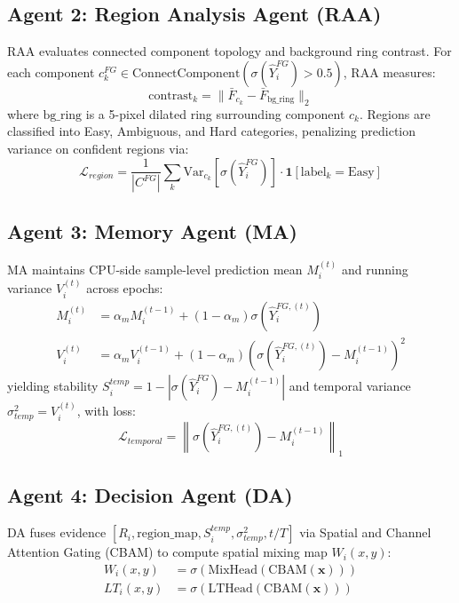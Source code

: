 \documentclass[journal,twoside,web]{IEEEtran}
\begin{document}
\subsection{Agent 2: Region Analysis Agent (RAA)}

RAA evaluates connected component topology and background ring contrast. For each component $c_k^{FG} \in \text{ConnectComponent}(\sigma(\hat{Y}_i^{FG}) > 0.5)$, RAA measures:
\begin{equation}
\text{contrast}_k = \|\bar{F}_{c_k} - \bar{F}_{\text{bg\_ring}}\|_2
\end{equation}
where $\text{bg\_ring}$ is a 5-pixel dilated ring surrounding component $c_k$. Regions are classified into Easy, Ambiguous, and Hard categories, penalizing prediction variance on confident regions via:
\begin{equation}
\mathcal{L}_{region} = \frac{1}{|C^{FG}|}\sum_{k} \text{Var}_{c_k}\left[\sigma(\hat{Y}_i^{FG})\right] \cdot \mathbf{1}[\text{label}_k = \text{Easy}]
\end{equation}

\subsection{Agent 3: Memory Agent (MA)}

MA maintains CPU-side sample-level prediction mean $M_i^{(t)}$ and running variance $V_i^{(t)}$ across epochs:
\begin{align}
M_i^{(t)} &= \alpha_m M_i^{(t-1)} + (1-\alpha_m) \sigma(\hat{Y}_i^{FG,(t)}) \\
V_i^{(t)} &= \alpha_m V_i^{(t-1)} + (1-\alpha_m) \left(\sigma(\hat{Y}_i^{FG,(t)}) - M_i^{(t-1)}\right)^2
\end{align}
yielding stability $S_i^{temp} = 1 - |\sigma(\hat{Y}_i^{FG}) - M_i^{(t-1)}|$ and temporal variance $\sigma^2_{temp} = V_i^{(t)}$, with loss:
\begin{equation}
\mathcal{L}_{temporal} = \left\|\sigma(\hat{Y}_i^{FG,(t)}) - M_i^{(t-1)}\right\|_1
\end{equation}

\subsection{Agent 4: Decision Agent (DA)}

DA fuses evidence $[R_i, \text{region\_map}, S_i^{temp}, \sigma^2_{temp}, t/T]$ via Spatial and Channel Attention Gating (CBAM) to compute spatial mixing map $W_i(x,y)$:
\begin{align}
W_i(x,y) &= \sigma\left(\text{MixHead}\left(\text{CBAM}(\mathbf{x})\right)\right) \\
LT_i(x,y) &= \sigma\left(\text{LTHead}\left(\text{CBAM}(\mathbf{x})\right)\right)
\end{align}
\end{document}
